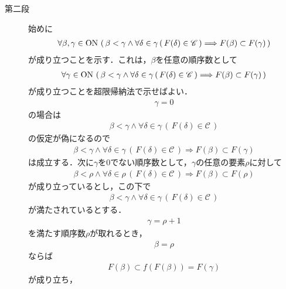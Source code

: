 \begin{sketch}
\begin{description}
			\item[第二段]
				 始めに
				 \begin{align}
					\forall \beta,\gamma \in \mathrm{ON}\,
					\left(\, \beta < \gamma \wedge \forall \delta \in \gamma\, (\, F(\delta) \in \mathscr{C}\, )
					\Longrightarrow F(\beta) \subset F(\gamma)\, \right)
				\end{align}
				が成り立つことを示す．これは，$\beta$を任意の順序数として
				\begin{align}
					\forall \gamma \in \mathrm{ON}\, \left(\, \beta < \gamma \wedge
					\forall \delta \in \gamma\, (\, F(\delta) \in \mathscr{C}\, )
					\Longrightarrow F(\beta) \subset F(\gamma)\, \right)
				\end{align}
				が成り立つことを超限帰納法で示せばよい．
				\begin{align}
					\gamma = 0
				\end{align}
				の場合は
				\begin{align}
					\beta < \gamma \wedge \forall \delta \in \gamma\, (\, F(\delta) \in \mathscr{C}\, )
				\end{align}
				の仮定が偽になるので
				\begin{align}
					\beta < \gamma \wedge \forall \delta \in \gamma\, (\, F(\delta) \in \mathscr{C}\, )
					\Longrightarrow F(\beta) \subset F(\gamma)
				\end{align}
				は成立する．次に$\gamma$を$0$でない順序数として，$\gamma$の任意の要素$\rho$に対して
				\begin{align}
					\beta < \rho \wedge \forall \delta \in \rho\, (\, F(\delta) \in \mathscr{C}\, )
					\Longrightarrow F(\beta) \subset F(\rho)
					\label{fom:thm_existence_of_maximal_chain_1}
				\end{align}
				が成り立っているとし，この下で
				\begin{align}
					\beta < \gamma \wedge \forall \delta \in \gamma\, (\, F(\delta) \in \mathscr{C}\, )
				\end{align}
				が満たされているとする．
				\begin{align}
					\gamma = \rho + 1
				\end{align}
				を満たす順序数$\rho$が取れるとき，
				\begin{align}
					\beta = \rho
				\end{align}
				ならば
				\begin{align}
					F(\beta) \subset f(F(\beta)) = F(\gamma)
				\end{align}
				が成り立ち，
				\begin{align}

\end{align}
\end{description}
\end{sketch}
